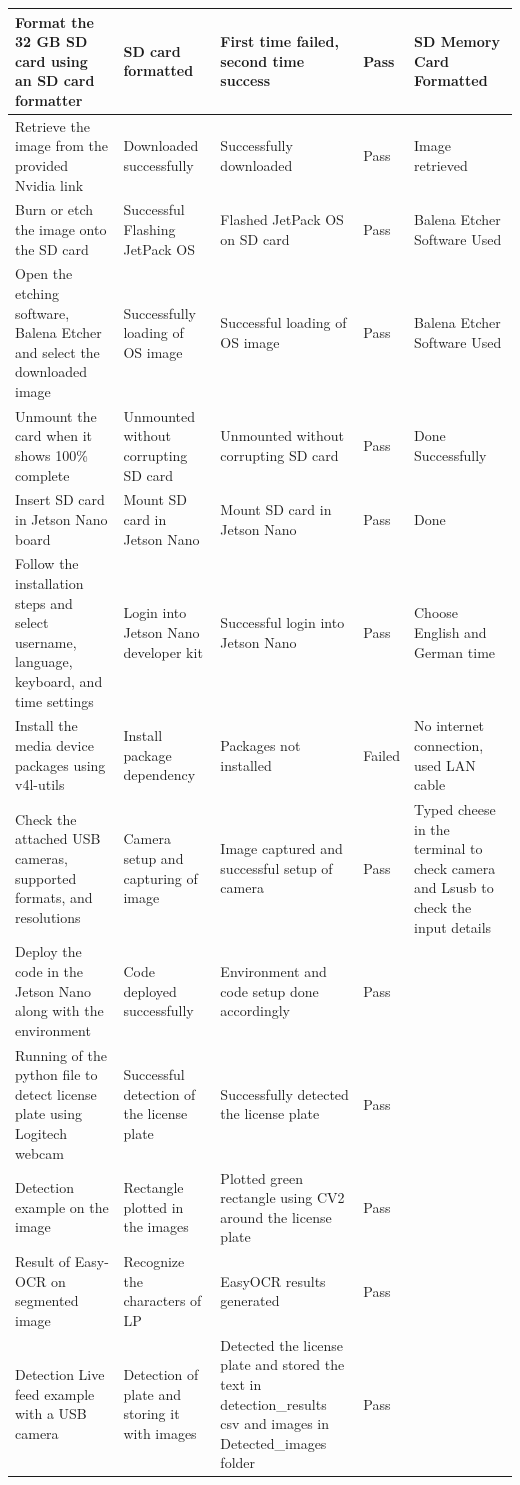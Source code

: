 \begin{longtable}{|p{3cm}|p{2.5cm}|p{3cm}|p{1.5cm}|p{3cm}|}
	Format the 32 GB SD card using an SD card formatter & SD card formatted & First time failed, second time success & Pass & SD Memory Card Formatted \\
	\hline
	Retrieve the image from the provided Nvidia link & Downloaded successfully & Successfully downloaded & Pass & Image retrieved \\
	\hline
	Burn or etch the image onto the SD card & Successful Flashing JetPack OS & Flashed JetPack OS on SD card & Pass & Balena Etcher Software Used \\
	\hline
	Open the etching software, Balena Etcher and select the downloaded image & Successfully loading of OS image & Successful loading of OS image & Pass & Balena Etcher Software Used \\
	\hline
	Unmount the card when it shows 100\% complete & Unmounted without corrupting SD card & Unmounted without corrupting SD card & Pass & Done Successfully \\
	\hline
	Insert SD card in Jetson Nano board & Mount SD card in Jetson Nano & Mount SD card in Jetson Nano & Pass & Done \\
	\hline
	Follow the installation steps and select username, language, keyboard, and time settings & Login into Jetson Nano developer kit & Successful login into Jetson Nano & Pass & Choose English and German time \\
	\hline
	Install the media device packages using v4l-utils & Install package dependency & Packages not installed & Failed & No internet connection, used LAN cable \\
	\hline
	Check the attached USB cameras, supported formats, and resolutions & Camera setup and capturing of image & Image captured and successful setup of camera & Pass & Typed cheese in the terminal to check camera and Lsusb to check the input details \\
	\hline
	Deploy the code in the Jetson Nano along with the environment & Code deployed successfully & Environment and code setup done accordingly & Pass &  \\
	\hline
	Running of the python file to detect license plate using Logitech webcam & Successful detection of the license plate & Successfully detected the license plate & Pass &  \\
	\hline
	Detection example on the image & Rectangle plotted in the images & Plotted green rectangle using CV2 around the license plate & Pass &  \\
	\hline
	Result of Easy-OCR on segmented image & Recognize the characters of LP & EasyOCR results generated & Pass &  \\
	\hline
	Detection Live feed example with a USB camera & Detection of plate and storing it with images & Detected the license plate and stored the text in detection\_results csv and images in Detected\_images folder & Pass &  \\
	\hline
\end{longtable}

	
		
		
		
		
		
		
		
		
		
		
		
		
		
		
		
